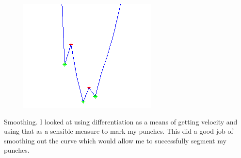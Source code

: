 \begin{figure}[t!]
\hspace{0.5cm}
\begin{minipage}{6.0cm}
    \centering
    \label{fig:kinect2}
\end{minipage}
\begin{minipage}{3.5cm}
    \centering
    \includegraphics[height=0.15\textheight]{fig04/fig05}
    \label{fig:kinect3}
\end{minipage}
\end{figure}


Smoothing.
I looked at using differentiation as a means of getting velocity and using that as a sensible measure to mark my punches. This did a good job of smoothing out the curve which would allow me to successfully segment my punches. 


